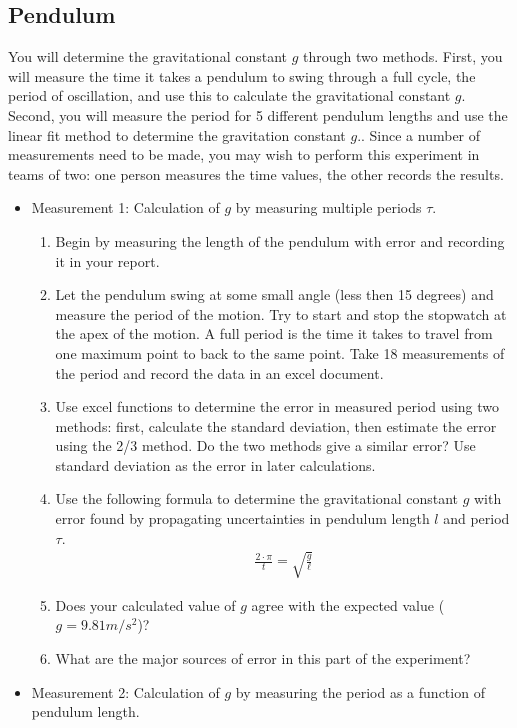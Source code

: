 \subsection{Pendulum}

You will determine the gravitational constant $g$ through two methods. First, you will measure the time it takes a pendulum to swing through a full cycle, the period of oscillation, and use this to calculate the gravitational constant $g$. Second, you will measure the period for 5 different pendulum lengths and use the linear fit method to determine the gravitation constant $g$.. Since a number of measurements need to be made, you may wish to perform this experiment in teams of two: one person measures the time values, the other records the results. \myskip

\begin{itemize}
\item Measurement 1: Calculation of $g$ by measuring multiple periods $\tau$.
\begin{enumerate}
\item Begin by measuring the length of the pendulum with error and recording it in your report.
\item Let the pendulum swing at some small angle (less then 15 degrees) and measure the period of the motion. Try to start and stop the stopwatch at the apex of the motion. A full period is the time it takes to travel from one maximum point to back to the same point. Take 18 measurements of the period and record the data in an excel document.
\item Use excel functions to determine the error in measured period using two methods: first, calculate the standard deviation, then estimate the error using the 2/3 method. Do the two methods give a similar error? Use standard deviation as the error in later calculations.
\item Use the following formula to determine the gravitational constant $g$ with error found by propagating uncertainties in pendulum length $l$ and period $\tau$.
\begin{gather}
 \frac{2\cdot \pi}{t} = \sqrt{\frac{g}{\ell}}
\end{gather}
\item Does your calculated value of $g$ agree with the expected value ($g=9.81 m/s^2$)?
\item What are the major sources of error in this part of the experiment?
\end{enumerate}
\item Measurement 2: Calculation of $g$ by measuring the period as a function of pendulum length.

\end{itemize}
